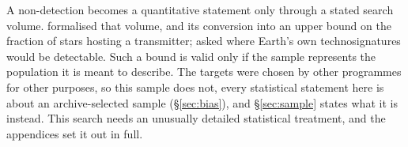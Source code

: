 A non-detection becomes a quantitative statement only through a stated
search volume. \citet{Wright2018} formalised that volume, and
\citet{Margot2023} its conversion into an upper bound on the fraction of
stars hosting a transmitter; \citet{EarthDetectingEarth2025} asked where
Earth's own technosignatures would be detectable. Such a bound is valid
only if the sample represents the population it is meant to describe. The
targets were chosen by other programmes for other purposes, so this sample
does not, every statistical statement here is about an archive-selected
sample (\S\ref{sec:bias}), and \S\ref{sec:sample} states what it is instead.
This search needs an unusually detailed statistical treatment, and the
appendices set it out in full.

